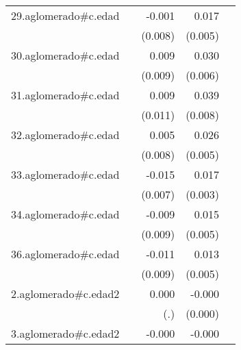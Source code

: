 {\begin{longtable}{l*{4}{D{.}{.}{-1}}}
\addlinespace
29.aglomerado#c.edad&                     &      -0.001         &       0.017\sym{***}&                     \\
            &                     &     (0.008)         &     (0.005)         &                     \\
\addlinespace
30.aglomerado#c.edad&                     &       0.009         &       0.030\sym{***}&                     \\
            &                     &     (0.009)         &     (0.006)         &                     \\
\addlinespace
31.aglomerado#c.edad&                     &       0.009         &       0.039\sym{***}&                     \\
            &                     &     (0.011)         &     (0.008)         &                     \\
\addlinespace
32.aglomerado#c.edad&                     &       0.005         &       0.026\sym{***}&                     \\
            &                     &     (0.008)         &     (0.005)         &                     \\
\addlinespace
33.aglomerado#c.edad&                     &      -0.015\sym{*}  &       0.017\sym{***}&                     \\
            &                     &     (0.007)         &     (0.003)         &                     \\
\addlinespace
34.aglomerado#c.edad&                     &      -0.009         &       0.015\sym{**} &                     \\
            &                     &     (0.009)         &     (0.005)         &                     \\
\addlinespace
36.aglomerado#c.edad&                     &      -0.011         &       0.013\sym{*}  &                     \\
            &                     &     (0.009)         &     (0.005)         &                     \\
\addlinespace
2.aglomerado#c.edad2&                     &       0.000         &      -0.000\sym{*}  &                     \\
            &                     &         (.)         &     (0.000)         &                     \\
\addlinespace
3.aglomerado#c.edad2&                     &      -0.000         &      -0.000\sym{***}&                     \\

\end{longtable}}
